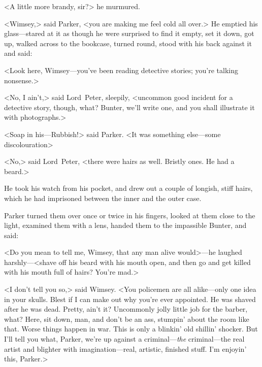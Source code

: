 <A little more brandy, sir?> he murmured.

<Wimsey,> said Parker, <you are making me feel cold all over.> He emptied his glass—stared at it as though he were surprised to find it empty, set it down, got up, walked across to the bookcase, turned round, stood with his back against it and said:

<Look here, Wimsey—you've been reading detective stories; you're talking nonsense.>

<No, I ain't,> said Lord~Peter, sleepily, <uncommon good incident for a detective story, though, what? Bunter, we'll write one, and you shall illustrate it with photographs.>

<Soap in his—Rubbish!> said Parker. <It was something else—some discolouration\longdash>

<No,> said Lord~Peter, <there were hairs as well. Bristly ones. He had a beard.>

He took his watch from his pocket, and drew out a couple of longish, stiff hairs, which he had imprisoned between the inner and the outer case.

Parker turned them over once or twice in his fingers, looked at them close to the light, examined them with a lens, handed them to the impassible Bunter, and said:

<Do you mean to tell me, Wimsey, that any man alive would>—he laughed harshly—<shave off his beard with his mouth open, and then go and get killed with his mouth full of hairs? You're mad.>

<I don't tell you so,> said Wimsey. <You policemen are all alike—only one idea in your skulls. Blest if I can make out why you're ever appointed. He was shaved after he was dead. Pretty, ain't it? Uncommonly jolly little job for the barber, what? Here, sit down, man, and don't be an ass, stumpin' about the room like that. Worse things happen in war. This is only a blinkin' old shillin' shocker. But I'll tell you what, Parker, we're up against a criminal—\textit{the} criminal—the real artist and blighter with imagination—real, artistic, finished stuff. I'm enjoyin' this, Parker.>